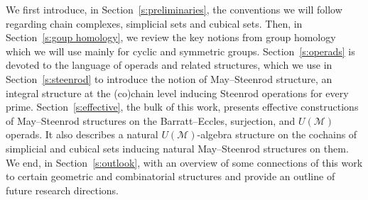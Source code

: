 We first introduce, in Section~\ref{s:preliminaries}, the conventions we will follow regarding chain complexes, simplicial sets and cubical sets.
Then, in Section~\ref{s:goup homology}, we review the key notions from group homology which we will use mainly for cyclic and symmetric groups.
Section~\ref{s:operads} is devoted to the language of operads and related structures, which we use in Section~\ref{s:steenrod} to introduce the notion of May--Steenrod structure, an integral structure at the (co)chain level inducing Steenrod operations for every prime.
Section~\ref{s:effective}, the bulk of this work, presents effective constructions of May--Steenrod structures on the Barratt--Eccles, surjection, and $U(\mathcal M)$ operads.
It also describes a natural $U(\mathcal M)$-algebra structure on the cochains of simplicial and cubical sets inducing natural May--Steenrod structures on them.
We end, in Section~\ref{s:outlook}, with an overview of some connections of this work to certain geometric and combinatorial structures and provide an outline of future research directions.